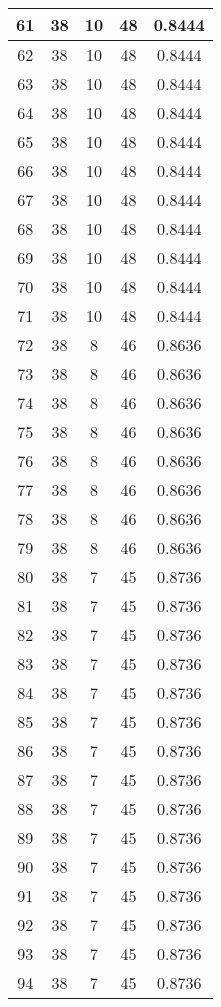 \documentclass[letterpaper, 12pt]{article}
\begin{document}
\begin{longtable}{|c|c|c|c|c|}
\hline
61 & 38 & 10 & 48 & 0.8444 \\
\hline
62 & 38 & 10 & 48 & 0.8444 \\
\hline
63 & 38 & 10 & 48 & 0.8444 \\
\hline
64 & 38 & 10 & 48 & 0.8444 \\
\hline
65 & 38 & 10 & 48 & 0.8444 \\
\hline
66 & 38 & 10 & 48 & 0.8444 \\
\hline
67 & 38 & 10 & 48 & 0.8444 \\
\hline
68 & 38 & 10 & 48 & 0.8444 \\
\hline
69 & 38 & 10 & 48 & 0.8444 \\
\hline
70 & 38 & 10 & 48 & 0.8444 \\
\hline
71 & 38 & 10 & 48 & 0.8444 \\
\hline
72 & 38 & 8 & 46 & 0.8636 \\
\hline
73 & 38 & 8 & 46 & 0.8636 \\
\hline
74 & 38 & 8 & 46 & 0.8636 \\
\hline
75 & 38 & 8 & 46 & 0.8636 \\
\hline
76 & 38 & 8 & 46 & 0.8636 \\
\hline
77 & 38 & 8 & 46 & 0.8636 \\
\hline
78 & 38 & 8 & 46 & 0.8636 \\
\hline
79 & 38 & 8 & 46 & 0.8636 \\
\hline
80 & 38 & 7 & 45 & 0.8736 \\
\hline
81 & 38 & 7 & 45 & 0.8736 \\
\hline
82 & 38 & 7 & 45 & 0.8736 \\
\hline
83 & 38 & 7 & 45 & 0.8736 \\
\hline
84 & 38 & 7 & 45 & 0.8736 \\
\hline
85 & 38 & 7 & 45 & 0.8736 \\
\hline
86 & 38 & 7 & 45 & 0.8736 \\
\hline
87 & 38 & 7 & 45 & 0.8736 \\
\hline
88 & 38 & 7 & 45 & 0.8736 \\
\hline
89 & 38 & 7 & 45 & 0.8736 \\
\hline
90 & 38 & 7 & 45 & 0.8736 \\
\hline
91 & 38 & 7 & 45 & 0.8736 \\
\hline
92 & 38 & 7 & 45 & 0.8736 \\
\hline
93 & 38 & 7 & 45 & 0.8736 \\
\hline
94 & 38 & 7 & 45 & 0.8736 \\
\hline

\end{longtable}
\end{document}
